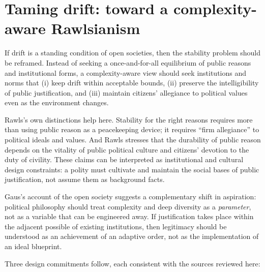 \documentclass[12pt]{report}
\begin{document}
\section{Taming drift: toward a complexity-aware Rawlsianism}

If drift is a standing condition of open societies, then the stability problem should be reframed. Instead of seeking a once-and-for-all equilibrium of public reasons and institutional forms, a complexity-aware view should seek institutions and norms that (i) keep drift within acceptable bounds, (ii) preserve the intelligibility of public justification, and (iii) maintain citizens’ allegiance to political values even as the environment changes.

Rawls’s own distinctions help here. Stability for the right reasons requires more than using public reason as a peacekeeping device; it requires “firm allegiance” to political ideals and values. \parencite[p.~459]{rawls2005political} And Rawls stresses that the durability of public reason depends on the vitality of public political culture and citizens’ devotion to the duty of civility. \parencite[p.~485]{rawls2005political} These claims can be interpreted as institutional and cultural design constraints: a polity must cultivate and maintain the social bases of public justification, not assume them as background facts.

Gaus’s account of the open society suggests a complementary shift in aspiration: political philosophy should treat complexity and deep diversity as a \emph{parameter}, not as a variable that can be engineered away. \parencite[p.~15]{gaus2021open} If justification takes place within the adjacent possible of existing institutions, then legitimacy should be understood as an achievement of an adaptive order, not as the implementation of an ideal blueprint.

Three design commitments follow, each consistent with the sources reviewed here:
\end{document}
